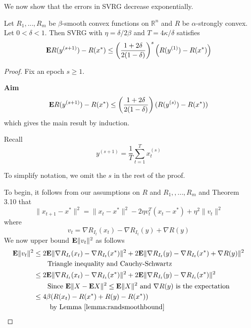 We now show that the errors in SVRG decrease exponentially.

\begin{theorem}
\label{thm:svrg}

Let $R_1, ..., R_m$ be $\beta$-smooth convex functions on $\mathbb{R}^n$ and $R$ be $\alpha$-strongly convex. Let $0< \delta < 1$. Then SVRG with $\eta = \delta/2\beta$ and $T = 4\kappa/\delta$ satisfies
\begin{equation}
	\mathbf{E} R(y^{(s+1)}) - R(x^*) \le \left(\frac{1+2\delta}{2(1-\delta)}\right)^s \left(R(y^{(1)}) - R(x^*)\right)
\end{equation}

\begin{proof}
Fix an epoch $s \ge 1$.

\textbf{Aim}
\begin{equation}
	\label{eqn:aim}
	\mathbf{E} R(y^{(s+1)}) - R(x^*) \le \left(\frac{1+2\delta}{2(1-\delta)}\right) (R(y^{(s)}) - R(x^*))
\end{equation}
which gives the main result by induction.

Recall
\begin{equation}
	y^{(s+1)} = \frac{1}{T}\sum_{t=1}^T x_t^{(s)}
\end{equation}

To simplify notation, we omit the $s$ in the rest of the proof.

To begin, it follows from our assumptions on $R$ and $R_1, , ..., R_m$ and \cite{bubeck} Theorem 3.10 that
\begin{equation}
	\label{eqn:vbound}
	\|x_{t+1} - x^*\|^2 = \|x_t - x^*\|^2 - 2\eta v_t^T(x_t - x^*) + \eta^2\|v_t\|^2
\end{equation}
where
\begin{equation}
	v_t = \nabla R_{I_t}(x_t) - \nabla R_{I_t}(y) + \nabla R(y)
\end{equation}
We now upper bound $\mathbf{E} \|v_t\|^2$ as follows
\begin{align}
	\mathbf{E} \|v_t\|^2 &\le 2\mathbf{E} \|\nabla R_{I_t}(x_t) - \nabla R_{I_t}(x^*)\|^2 + 2\mathbf{E} \|\nabla R_{I_t}(y) - \nabla R_{I_t}(x^*) + \nabla R(y)\|^2 \\
	& \qquad \text{Triangle inequality and Cauchy-Schwartz} \\
	& \le 2\mathbf{E} \|\nabla R_{I_t}(x_t) - \nabla R_{I_t}(x^*)\|^2 + 2\mathbf{E} \|\nabla R_{I_t}(y) - \nabla R_{I_t}(x^*)\|^2 \\
	& \qquad \text{Since } \mathbf{E} \|X - \mathbf{E} X\|^2 \le \mathbf{E} \|X\|^2 \text{ and } \nabla R(y) \text{ is the expectation} \\
	& \le 4\beta(R (x_t) - R(x^*) + R(y) - R(x^*))\\
	& \qquad \text{ by Lemma \ref{lemma:randsmoothbound}}
\end{align}


\end{proof}
\end{theorem}

